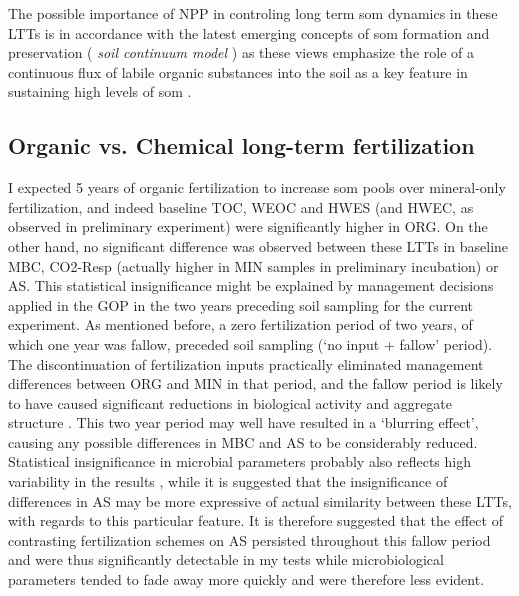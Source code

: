	The possible importance of NPP in controling long term \gls{som} dynamics in these LTTs is in accordance with the latest emerging concepts of \gls{som} formation and preservation (\textit{ soil continuum model} ) as these views emphasize the role of a continuous flux of labile organic substances into the soil as a key feature in sustaining high levels of \gls{som} \citep{kleber2010, lehmann2015}.

	\subsection{Organic vs. Chemical long-term fertilization}
	I expected 5 years of organic fertilization to increase \gls{som} pools over mineral-only fertilization, and indeed baseline TOC, WEOC and HWES (and HWEC, as observed in preliminary experiment) were significantly higher in ORG. On the other hand, no significant difference was observed between these LTTs in baseline MBC, CO2-Resp (actually higher in MIN samples in preliminary incubation) or AS. This statistical insignificance might be explained by management decisions applied in the GOP in the two years preceding soil sampling for the current experiment. As mentioned before, a zero fertilization period of two years, of which one year was fallow, preceded soil sampling (‘no input + fallow' period). The discontinuation of fertilization inputs practically eliminated management differences between ORG and MIN in that period, and the fallow period is likely to have caused significant reductions in biological activity and aggregate structure \citep{redmile-gordon2020, golchin1994}. This two year period may well have resulted in a ‘blurring effect’, causing any possible differences in MBC and AS to be considerably reduced.
	Statistical insignificance in microbial parameters probably also reflects high variability in the results , while it is suggested that the insignificance of differences in AS may be more expressive of actual similarity between these LTTs, with regards to this particular feature.
	It is therefore suggested that the effect of contrasting fertilization schemes on AS persisted throughout this fallow period and were thus significantly detectable  in my tests while microbiological parameters tended to fade away more quickly and were therefore less evident.

